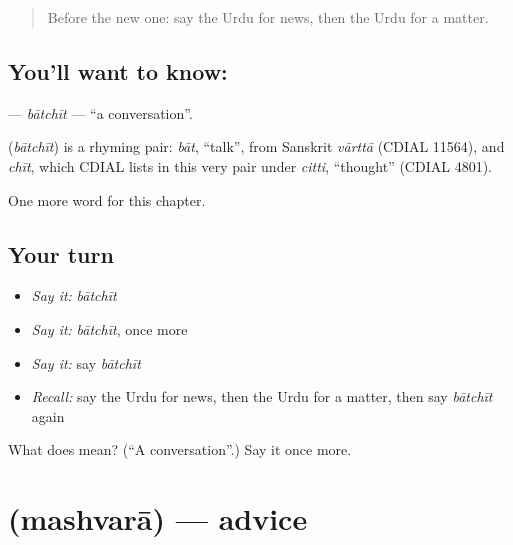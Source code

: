 \label{lesson:UR-C204-batchit}



\begin{quote}
Before the new one: say the Urdu for news, then the Urdu for a matter.
\end{quote}

\subsection*{You'll want to know:  }
\textbf{ } — \emph{bātchīt} — \textquotedblleft{}a conversation\textquotedblright{}.

\begin{cousinweb}
\textbf{ } (\emph{bātchīt}) is a rhyming pair: \emph{bāt}, \textquotedblleft{}talk\textquotedblright{}, from Sanskrit \emph{vārttā} (CDIAL 11564), and \emph{chīt}, which CDIAL lists in this very pair under \emph{citti}, \textquotedblleft{}thought\textquotedblright{} (CDIAL 4801).
\end{cousinweb}

\begin{grammarlens}[title={What you've built}]
One more word for this chapter.
\end{grammarlens}

\subsection*{Your turn}
\begin{itemize}
\raggedright
  \item \emph{Say it:} \emph{bātchīt}
  \item \emph{Say it:} \emph{bātchīt}, once more
  \item \emph{Say it:} say \emph{bātchīt}
  \item \emph{Recall:} say the Urdu for news, then the Urdu for a matter, then say \emph{bātchīt} again
\end{itemize}

\begin{tcolorbox}[breakable,colback=teal!4,colframe=teal!35!black,title={Before you move on}]
What does   mean? (\textquotedblleft{}A conversation\textquotedblright{}.) Say it once more.
\end{tcolorbox}
\section[\texorpdfstring{\ur{مشورہ} (mashvarā)}{مشورہ (mashvarā)}]{ (mashvarā) — advice}

